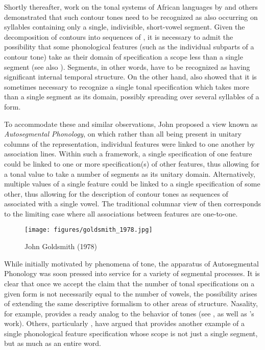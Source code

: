 Shortly thereafter, work on the tonal systems of African languages by
\citet{leben71:thesis} and others demonstrated that such contour tones
need to be recognized as also occurring on syllables containing only a
single, indivisible, short-vowel segment. Given the decomposition of
contours into sequences of , it is necessary to admit the
possibility that some phonological features (such as the individual
subparts of a contour tone) take as their domain of specification a
scope less than a single segment (see also
\citealt{sra78:tone_features}). Segments, in other words, have to be
recognized as having significant internal temporal structure. On the
other hand, {\Leben} also showed that it is sometimes necessary to
recognize a single tonal specification which takes more than a single
segment as its domain, possibly spreading over several syllables of a
form.

To accommodate these and similar observations, John
\citet{goldsmith:thesis} proposed a view known as \emph{Autosegmental
Phonology}, on which rather than all being present in unitary columns
of the representation, individual features were linked to one another
by association lines. Within such a framework, a single specification of one feature
could be linked to one or more specification(s) of other features, thus allowing
for a tonal value to take a number of segments as its unitary domain.
Alternatively, multiple values of a single feature could be linked to a single
specification of some other, thus allowing for the description of
contour tones as sequences of  associated with a single
vowel. The traditional columnar view of  then
corresponds to the limiting case where all associations between
features are one-to-one.

\begin{wrapfigure}[15]{l}{.4\textwidth}
  \texttt{[image: figures/goldsmith\_1978.jpg]}
  \caption{John Goldsmith (1978)}
  \label{fig:ch.otlabphon.goldsmith}
\end{wrapfigure}
While initially motivated by phenomena of tone, the apparatus of
Autosegmental Phonology was soon pressed into service for a variety of
segmental processes. It is clear that once we accept the claim that
the number of tonal specifications on a given form is not necessarily
equal to the number of vowels, the possibility arises of extending the
same descriptive formalism to other areas of structure. Nasality, for
example, provides a ready analog to the behavior of tones (see
\citealt{sra76:nasals}, as well as {\Goldsmith}'s work). Others,
particularly \citet[and elsewhere]{clements76:vowel.harmony}, have
argued that  provides another example of a single
phonological feature specification whose scope is not just a single
segment, but as much as an entire word.

